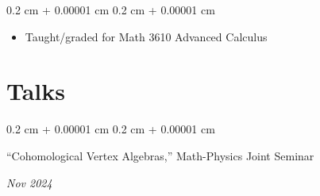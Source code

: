\documentclass[10pt, letterpaper]{article}
\newenvironment{highlights}{
    \begin{itemize}[
        topsep=0.10 cm,
        parsep=0.10 cm,
        partopsep=0pt,
        itemsep=0pt,
        leftmargin=0.4 cm + 10pt
    ]
}{
    \end{itemize}
} %
\newenvironment{onecolentry}{
    \begin{adjustwidth}{
        0.2 cm + 0.00001 cm
    }{
        0.2 cm + 0.00001 cm
    }
}{
    \end{adjustwidth}
} %
\newenvironment{twocolentry}[2][]{
    \onecolentry
    \def\secondColumn{#2}
    \setcolumnwidth{\fill, 4.5 cm}
    \begin{paracol}{2}
}{
    \switchcolumn \raggedleft \secondColumn
    \end{paracol}
    \endonecolentry
} %
\begin{document}
        \vspace{0.10 cm}
        \begin{onecolentry}
            \begin{highlights}
                \item Taught/graded for Math 3610 Advanced Calculus
            \end{highlights}
        \end{onecolentry}


    
    \section{Talks}
    \begin{twocolentry}{
        \textit{Nov 2024}}
            {``Cohomological Vertex Algebras,'' Math-Physics Joint Seminar}
        \end{twocolentry}


        

    
\end{document}
